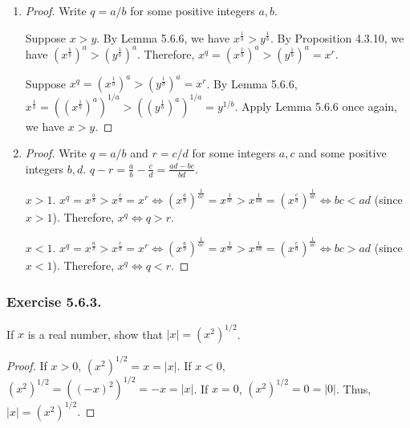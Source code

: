 \documentclass[12pt, letter]{article}
\begin{document}
\begin{enumerate}[label=(\alph*)]
\begin{proof}
        \begin{equation*}
            \begin{aligned}
                x^{-q}&=x^{-\frac{a}{b}}\\
                &=(x^{\frac{1}{b}})^{-a}\\
                &=\frac{1}{(x^{\frac{1}{b}})^a}\\
                &=\frac{1}{x^q}.
            \end{aligned}
        \end{equation*}
    \end{proof}
    \item \begin{proof}
        Write $q=a/b$ for some positive integers $a,b$. 
        
        Suppose $x>y$. By Lemma 5.6.6, we have $x^{\frac{1}{b}}>y^{\frac{1}{b}}$. By Proposition 4.3.10, we have $(x^{\frac{1}{b}})^a>(y^{\frac{1}{b}})^a$. Therefore, $x^q=(x^{\frac{1}{b}})^a>(y^{\frac{1}{b}})^a=x^r$.

        Suppose $x^q=(x^{\frac{1}{b}})^a>(y^{\frac{1}{b}})^a=x^r$. By Lemma 5.6.6, $x^{\frac{1}{b}}=((x^{\frac{1}{b}})^a)^{1/a}>((y^{\frac{1}{b}})^a)^{1/a}=y^{1/b}$. Apply Lemma 5.6.6 once again, we have $x>y$.
    \end{proof}
    \item \begin{proof}
         Write $q=a/b$ and $r=c/d$ for some integers $a,c$ and some positive integers $b,d$. $q-r=\frac{a}{b}-\frac{c}{d}=\frac{ad-bc}{bd}$. 

         $x>1$. $x^q=x^{\frac{a}{b}}>x^{\frac{c}{d}}=x^r\iff (x^{\frac{a}{b}})^{\frac{1}{ac}}=x^{\frac{1}{bc}}>x^{\frac{1}{ad}}=(x^{\frac{c}{d}})^\frac{1}{ac}\iff bc<ad$ (since $x>1$). Therefore, $x^q\iff q>r$. 

         $x<1$. $x^q=x^{\frac{a}{b}}>x^{\frac{c}{d}}=x^r\iff (x^{\frac{a}{b}})^{\frac{1}{ac}}=x^{\frac{1}{bc}}>x^{\frac{1}{ad}}=(x^{\frac{c}{d}})^\frac{1}{ac}\iff bc>ad$ (since $x<1$). Therefore, $x^q\iff q<r$. 
    \end{proof}
\end{enumerate}
\subsubsection*{Exercise 5.6.3.}
If $x$ is a real number, show that $|x|=(x^2)^{1/2}$.
\begin{proof}
    If $x>0$, $(x^2)^{1/2}=x=|x|$. If $x<0$, $(x^2)^{1/2}=((-x)^2)^{1/2}=-x=|x|$. If $x=0$, $(x^2)^{1/2}=0=|0|$. Thus, $|x|=(x^2)^{1/2}$. 
\end{proof}
\end{document}
